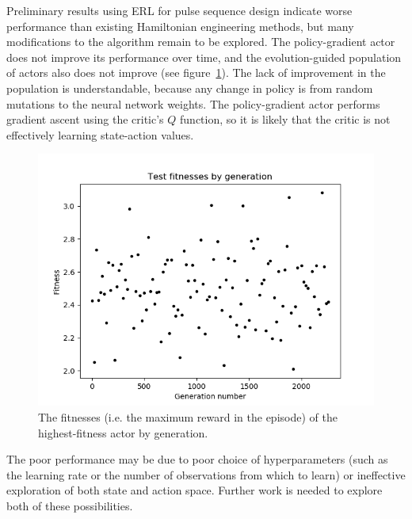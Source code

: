 \documentclass{article}
\begin{document}
Preliminary results using ERL for pulse sequence design indicate worse performance than existing Hamiltonian engineering methods, but many modifications to the algorithm remain to be explored.
The policy-gradient actor does not improve its performance over time, and the evolution-guided population of actors also does not improve (see figure~\ref{fig:results}). The lack of improvement in the population is understandable, because any change in policy is from random mutations to the neural network weights. The policy-gradient actor performs gradient ascent using the critic's $Q$ function, so it is likely that the critic is not effectively learning state-action values.
\begin{figure}[ht]
    \centering
    \includegraphics[width=0.7\linewidth]{graphics/test_fit.png}
    \caption{The fitnesses (i.e. the maximum reward in the episode) of the highest-fitness actor by generation.}
    \label{fig:results}
\end{figure}
The poor performance may be due to poor choice of hyperparameters (such as the learning rate or the number of observations from which to learn) or ineffective exploration of both state and action space.
Further work is needed to explore both of these possibilities.

\printbibliography
\end{document}
